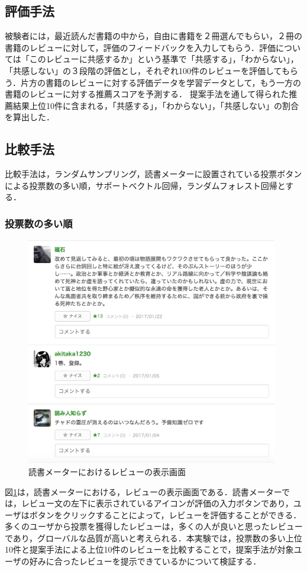 \documentclass[a4paper,11pt,oneside,openany]{jsbook}
\begin{document}
		\subsection{評価手法}
被験者には，最近読んだ書籍の中から，自由に書籍を２冊選んでもらい，２冊の書籍のレビューに対して，評価のフィードバックを入力してもらう．評価については「このレビューに共感するか」という基準で「共感する」，「わからない」，「共感しない」の３段階の評価とし，それぞれ100件のレビューを評価してもらう．片方の書籍のレビューに対する評価データを学習データとして，もう一方の書籍のレビューに対する推薦スコアを予測する．
提案手法を通して得られた推薦結果上位10件に含まれる，「共感する」，「わからない」，「共感しない」の割合を算出した．

\subsection{比較手法}
比較手法は，ランダムサンプリング，読書メーターに設置されている投票ボタンによる投票数の多い順，サポートベクトル回帰，ランダムフォレスト回帰とする．
\subsubsection{投票数の多い順}
\begin{figure}[tb]
	\begin{center} %
		\includegraphics [width = 110mm] {figures/bookmeter_vote.png} %
	\end{center}
	\caption{読書メーターにおけるレビューの表示画面} %
	\label{fig:vote} %
\end{figure}
図\ref{fig:vote}は，読書メーターにおける，レビューの表示画面である．読書メーターでは，レビュー文の左下に表示されているアイコンが評価の入力ボタンであり，ユーザはボタンをクリックすることによって，レビューを評価することができる．多くのユーザから投票を獲得したレビューは，多くの人が良いと思ったレビューであり，グローバルな品質が高いと考えられる．本実験では，投票数の多い上位10件と提案手法による上位10件のレビューを比較することで，提案手法が対象ユーザの好みに合ったレビューを提示できているかについて検証する．
\end{document}
